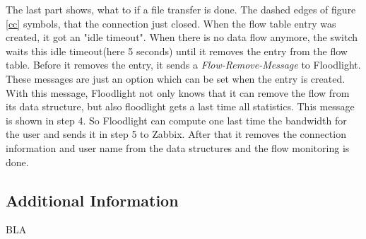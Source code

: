 The last part shows, what to if a file transfer is done. The dashed edges of figure \ref{cc} symbols, that the connection just closed. When the flow table entry was created, it got an "idle timeout"\cite[p. 11]{ofspec}. When there is no data flow anymore, the switch waits this idle timeout(here 5 seconds) until it removes the entry from the flow table. Before it removes the entry, it sends a \textit{Flow-Remove-Message}\cite[p. 37]{ofspec} to Floodlight. These messages are just an option which can be set when the entry is created. With this message, Floodlight not only knows that it can remove the flow from its data structure, but also floodlight gets a last time all statistics. This message is shown in step 4. So Floodlight can compute one last time the bandwidth for the user and sends it in step 5 to Zabbix. After that it removes the connection information and user name from the data structures and the flow monitoring is done.

\subsection{Additional Information}
BLA  
